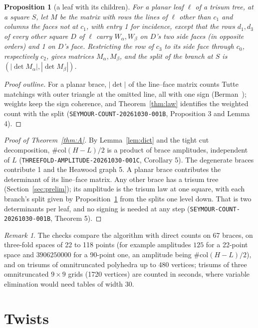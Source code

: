\documentclass[11pt]{article}
\newtheorem{proposition}[theorem]{Proposition}
\theoremstyle{definition}
\theoremstyle{remark}
\newtheorem{remark}[theorem]{Remark}
\newcommand{\col}{\#\mathrm{col}}
\begin{document}
\begin{proposition}[a leaf with its children]\label{prop:leaf}
For a planar leaf $\ell$ of a trisum tree, at a square $S$, let $M$ be the
matrix with rows the lines of $\ell$ other than $c_1$ and columns the faces
not at $c_1$, with entry 1 for incidence, except that the rows $d_1,d_3$ of
every other square $D$ of $\ell$ carry $W_\alpha,W_\beta$ on $D$'s two side
faces (in opposite orders) and 1 on $D$'s face. Restricting the row of $c_3$
to its side face through $c_0$, respectively $c_2$, gives matrices
$M_\alpha,M_\beta$, and the split of the branch at $S$ is
$(|\det M_\alpha|,|\det M_\beta|)$.
\end{proposition}
\begin{proof}[Proof outline]
For a planar brace, $|\det|$ of the line--face matrix counts Tutte matchings
with outer triangle at the omitted line, all with one sign (Berman~\cite{Ber80});
weights keep the sign coherence, and Theorem~\ref{thm:law} identifies the
weighted count with the split (\texttt{SEYMOUR-COUNT-20261030-001B},
Proposition 3 and Lemma 4).
\end{proof}

\begin{proof}[Proof of Theorem~\ref{thm:A}]
By Lemma~\ref{lem:dict} and the tight cut decomposition, $\col(H-L)/2$ is a
product of brace amplitudes, independent of $L$ (\texttt{THREEFOLD-AMPLITUDE-20261030-001C},
Corollary 5). The degenerate braces contribute 1 and the Heawood graph 5. A
planar brace contributes the determinant of its line--face matrix. Any other
brace has a trisum tree (Section~\ref{sec:prelim}); its amplitude is the
trisum law at one square, with each branch's split given by
Proposition~\ref{prop:leaf} from the splits one level down. That is two
determinants per leaf, and no signing is needed at any step
(\texttt{SEYMOUR-COUNT-20261030-001B}, Theorem 5).
\end{proof}

\begin{remark}
The checks compare the algorithm with direct counts on 67 braces, on
three-fold spaces of 22 to 118 points (for example amplitudes $125$ for a
22-point space and $3906250000$ for a 90-point one, an amplitude being
$\col(H-L)/2$), and on trisums of omnitruncated polyhedra up to 480 vertices; trisums of three omnitruncated $9\times 9$ grids (1720
vertices) are counted in seconds, where variable elimination would need tables
of width 30.
\end{remark}

\section{Twists}\label{sec:B}
\end{document}
